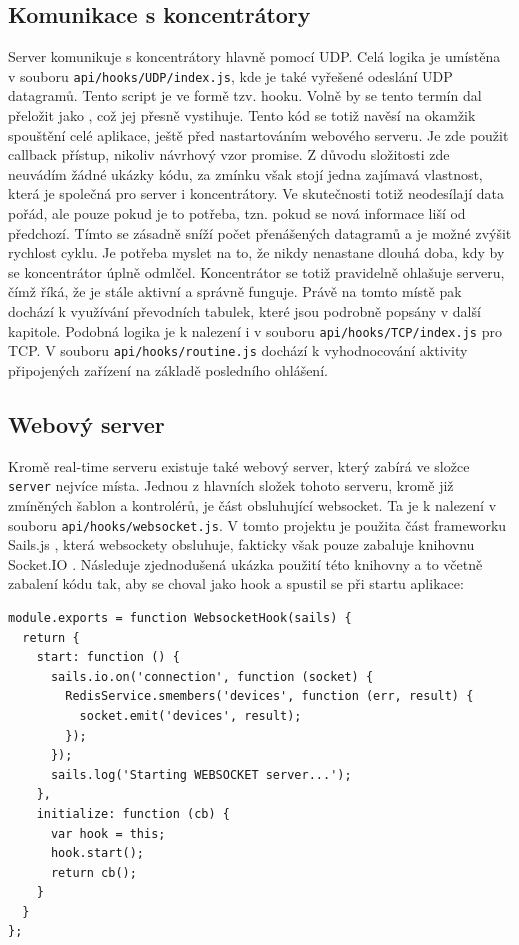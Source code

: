 \subsection{Komunikace s koncentrátory}
Server komunikuje s koncentrátory hlavně pomocí UDP. Celá logika je u\-mís\-tě\-na v souboru \texttt{api/hooks/UDP/index.js}, kde je také vyřešené odeslání UDP datagramů. Tento script je ve formě tzv. hooku. Volně by se tento termín dal přeložit jako , což jej přesně vystihuje. Tento kód se totiž navěsí na okamžik spouštění celé aplikace, ještě před nastartováním webového serveru. Je zde použit callback přístup, nikoliv návrhový vzor promise. Z důvodu složitosti zde neuvádím žádné ukázky kódu, za zmínku však stojí jedna zajímavá vlastnost, která je společná pro server i koncentrátory. Ve skutečnosti totiž neodesílají data pořád, ale pouze pokud je to potřeba, tzn. pokud se nová informace liší od předchozí. Tímto se zásadně sníží počet přenášených datagramů a je možné zvýšit rychlost cyklu. Je potřeba myslet na to, že nikdy nenastane dlouhá doba, kdy by se koncentrátor úplně odmlčel. Koncentrátor se totiž pravidelně ohlašuje serveru, čímž říká, že je stále aktivní a správně funguje. Právě na tomto místě pak dochází k využívání převodních tabulek, které jsou podrobně popsány v další kapitole. Podobná logika je k nalezení i v souboru \texttt{api/hooks/TCP/index.js} pro TCP. V souboru \texttt{api/hooks/routine.js} dochází k vyhodnocování aktivity připojených zařízení na základě posledního ohlášení.

\subsection{Webový server}
Kromě real-time serveru existuje také webový server, který zabírá ve složce \texttt{server} nejvíce místa. Jednou z hlavních složek tohoto serveru, kromě již zmíněných šablon a kontrolérů, je část obsluhující websocket. Ta je k nalezení v souboru \texttt{api/hooks/websocket.js}. V tomto projektu je použita část frameworku Sails.js \cite{sails}, která websockety obsluhuje, fakticky však pouze zabaluje knihovnu Socket.IO \cite{socket}. Následuje zjednodušená ukázka použití této knihovny a to včetně zabalení kódu tak, aby se choval jako hook a spustil se při startu aplikace:

\begin{verbatim}
module.exports = function WebsocketHook(sails) {
  return {
    start: function () {
      sails.io.on('connection', function (socket) {
        RedisService.smembers('devices', function (err, result) {
          socket.emit('devices', result);
        });
      });
      sails.log('Starting WEBSOCKET server...');
    },
    initialize: function (cb) {
      var hook = this;
      hook.start();
      return cb();
    }
  }
};
\end{verbatim}


